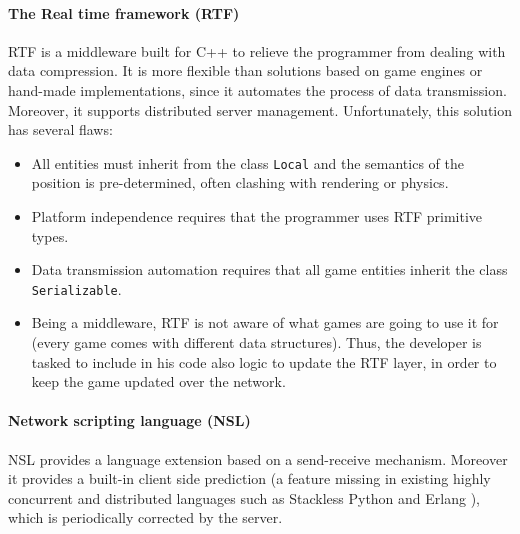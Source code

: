 \paragraph{The Real time framework (RTF)} RTF \cite{glinka2007rtf} is a middleware built for C++ to relieve the programmer from dealing with data compression. It is more flexible than solutions based on game engines or hand-made implementations, since it automates the process of data transmission. Moreover, it supports distributed server management. Unfortunately, this solution has several flaws:
\begin{itemize}
	\item All entities must inherit from the class \texttt{Local} and the semantics of the position is pre-determined, often clashing with rendering or physics.
	\item Platform independence requires that the programmer uses RTF primitive	types.
	\item Data transmission automation requires that all game entities inherit the class \texttt{Serializable}.
	\item Being a middleware, RTF is not aware of what games are going to use it for (every game comes with different data structures). Thus, the developer is tasked to include in his code also logic to update the RTF layer, in order to keep the game updated over the network.
\end{itemize}


\paragraph{Network scripting language (NSL)} NSL \cite{russell2008tackling} provides a language extension based on a send-receive mechanism. Moreover it provides a built-in client side prediction (a feature missing in existing highly concurrent and distributed languages such as Stackless Python \cite{kalogirou2005multithreaded} and Erlang \cite{armstrong1993concurrent}), which is periodically corrected by the server. 

